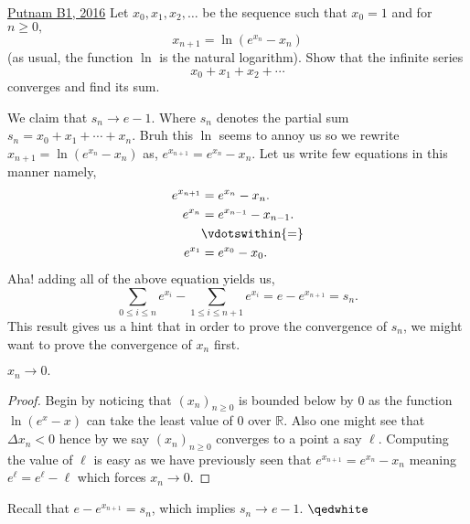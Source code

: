\begin{problem}{3}{\href{https://artofproblemsolving.com/community/q1h1349023p34703591}{Putnam B1, 2016}} Let $x_0,x_1,x_2,\dots$ be the sequence such that $x_0=1$ and for $n\ge 0,$
\[x_{n+1}=\ln(e^{x_n}-x_n)\](as usual, the function $\ln$ is the natural logarithm). Show that the infinite series
\[x_0+x_1+x_2+\cdots\]converges and find its sum.
	\begin{solution} We claim that $s_n\to e-1$. Where $s_n$ denotes the partial sum $s_n=x_0+x_1+\cdots+x_n$.
Bruh this $\ln$ seems to annoy us so we rewrite $x_{n+1}=\ln (e^{x_n}-x_n)$ as, $e^{x_{n+1}}=e^{x_n}-x_n.$ Let us write few equations in this manner namely,
\begin{align*}
		e^{x_{n+1}}&=e^{x_n}-x_n.\\
		e^{x_{n}}&=e^{x_{n-1}}-x_{n-1}.\\
		&\vdotswithin{=}\\
		e^{x_1}&=e^{x_0}-x_0.
	\end{align*}
	Aha! adding all of the above equation yields us,
$$\sum_{0\le i\le n}e^{x_i}-\sum_{1\le i\le n+1}e^{x_i}=e-e^{x_{n+1}}=s_n.$$This result gives us a hint that in order to prove the convergence of $s_n$, we might want to prove the convergence of $x_n$ first.
	\begin{claim}
	$x_n\to 0.$
	\end{claim}
	\begin{proof} Begin by noticing that $(x_n)_{n\ge 0}$ is bounded below by $0$ as the function $\ln(e^x-x)$ can take the least value of $0$ over $\mathbb{R}$. Also one might see that $\Delta x_n<0$ hence by  we say $(x_n)_{n\ge 0}$ converges to a point a say $\ell$. Computing the value of $\ell$ is easy as we have previously seen that $e^{x_{n+1}}=e^{x_n}-x_n$ meaning $e^{\ell}=e^{\ell}-\ell$ which forces $x_n\to 0$.
	\end{proof}

	\noindent Recall that $e-e^{x_{n+1}}=s_n$, which implies $s_n\to e-1$. $\qedwhite$
	\end{solution}
\end{problem}

